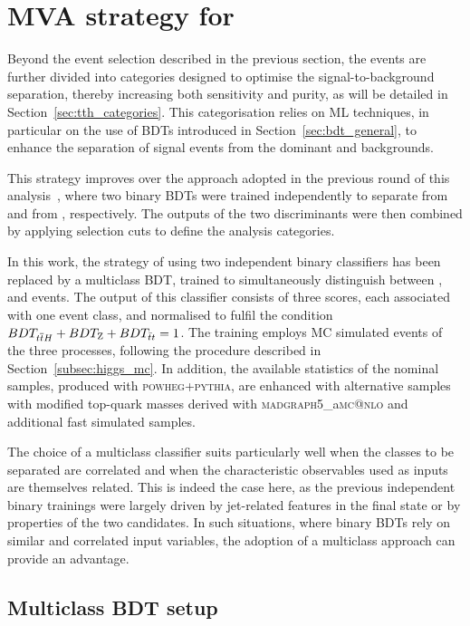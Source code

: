 \section{MVA strategy for \ttHtt}
\label{sec:tth_mva}

Beyond the event selection described in the previous section, the events are further divided into categories designed to optimise the signal-to-background separation, thereby increasing both sensitivity and purity, as will be detailed in Section~\ref{sec:tth_categories}. This categorisation relies on ML techniques, in particular on the use of BDTs introduced in Section~\ref{sec:bdt_general}, to enhance the separation of \ttH signal events from the dominant \ztautau and \ttbar backgrounds.

This strategy improves over the approach adopted in the previous round of this \htautau analysis~\cite{couplings}, where two binary BDTs were trained independently to separate \ttH from \ztautau and \ttH from \ttbar, respectively. The outputs of the two discriminants were then combined by applying selection cuts to define the analysis categories. 

In this work, the strategy of using two independent binary classifiers has been replaced by a multiclass BDT, trained to simultaneously distinguish between \ttH, \ztautau and \ttbar events. The output of this classifier consists of three scores, each associated with one event class, and normalised to fulfil the condition $BDT_{\text{\ensuremath{t\overline{t}H}}} + BDT_{\text{Z}} + BDT_{\text{$\bar{t}t$}} = 1$.
The training employs MC simulated events of the three processes, following the procedure described in Section~\ref{subsec:higgs_mc}. In addition, the available statistics of the nominal \ttbar samples, produced with \textsc{powheg+pythia}, are enhanced with alternative samples with modified top-quark masses derived with \textsc{madgraph5}\_a\textsc{mc@nlo} and additional fast simulated samples.

The choice of a multiclass classifier suits particularly well when the classes to be separated are correlated and when the characteristic observables used as inputs are themselves related. This is indeed the case here, as the previous independent binary trainings were largely driven by jet-related features in the final state or by properties of the two \tauhadvis candidates. In such situations, where binary BDTs rely on similar and correlated input variables, the adoption of a multiclass approach can provide an advantage.

\subsection{Multiclass BDT setup}

